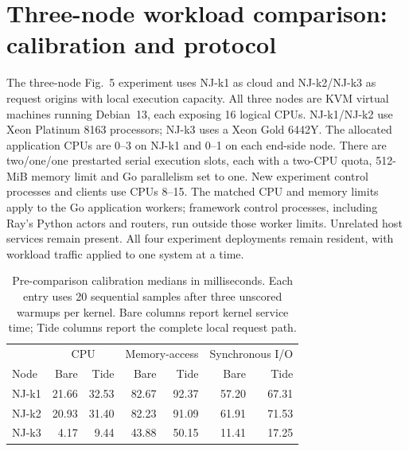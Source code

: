 \section*{Three-node workload comparison: calibration and protocol}
The three-node Fig.~5 experiment uses NJ-k1 as cloud and NJ-k2/NJ-k3 as request origins with local execution capacity. All three nodes are KVM virtual machines running Debian~13, each exposing 16 logical CPUs. NJ-k1/NJ-k2 use Xeon Platinum 8163 processors; NJ-k3 uses a Xeon Gold 6442Y. The allocated application CPUs are 0--3 on NJ-k1 and 0--1 on each end-side node. There are two/one/one prestarted serial execution slots, each with a two-CPU quota, 512-MiB memory limit and Go parallelism set to one. New experiment control processes and clients use CPUs 8--15. The matched CPU and memory limits apply to the Go application workers; framework control processes, including Ray's Python actors and routers, run outside those worker limits. Unrelated host services remain present. All four experiment deployments remain resident, with workload traffic applied to one system at a time.

\begin{table}[htbp]
\centering\small
\caption{Pre-comparison calibration medians in milliseconds. Each entry uses 20 sequential samples after three unscored warmups per kernel. Bare columns report kernel service time; Tide columns report the complete local request path.}
\label{tab:three-node-calibration}
\begin{tabular}{lrrrrrr}
\toprule
& \multicolumn{2}{c}{CPU} & \multicolumn{2}{c}{Memory-access} & \multicolumn{2}{c}{Synchronous I/O}\\
Node & Bare & Tide & Bare & Tide & Bare & Tide\\
\midrule
NJ-k1 & 21.66 & 32.53 & 82.67 & 92.37 & 57.20 & 67.31\\
NJ-k2 & 20.93 & 31.40 & 82.23 & 91.09 & 61.91 & 71.53\\
NJ-k3 & 4.17 & 9.44 & 43.88 & 50.15 & 11.41 & 17.25\\
\bottomrule
\end{tabular}
\end{table}

